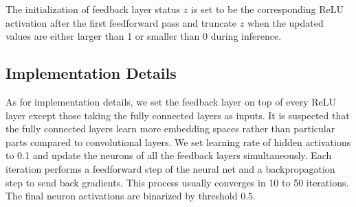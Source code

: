 The initialization of feedback layer status $z$ is set to be the corresponding ReLU activation after the first feedforward pass and truncate $z$ when the updated values are either larger than 1 or smaller than 0 during inference.

\subsection{Implementation Details}
As for implementation details, we set the feedback layer on top of every ReLU layer except those taking the fully connected layers as inputs. It is suspected that the fully connected layers learn more embedding spaces rather than particular parts compared to convolutional layers. We set learning rate of hidden activations to 0.1 and update the neurons of all the feedback layers simultaneously. Each iteration performs a feedforward step of the neural net and a backpropagation step to send back gradients. This process usually converges in 10 to 50 iterations. The final {\color{red} neuron activations} are binarized by threshold $0.5$.
